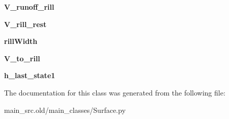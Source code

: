 \begin{DoxyCompactItemize}
\item 
\hypertarget{classmain__src_8old_1_1main__classes_1_1Surface_1_1SurArrs_ae21037f3984f4a9212bca50c4696e6f0}{{\bfseries V\-\_\-runoff\-\_\-rill}}\label{classmain__src_8old_1_1main__classes_1_1Surface_1_1SurArrs_ae21037f3984f4a9212bca50c4696e6f0}

\item 
\hypertarget{classmain__src_8old_1_1main__classes_1_1Surface_1_1SurArrs_aafcdb30381b35c91e4a321c55cbc0bb6}{{\bfseries V\-\_\-rill\-\_\-rest}}\label{classmain__src_8old_1_1main__classes_1_1Surface_1_1SurArrs_aafcdb30381b35c91e4a321c55cbc0bb6}

\item 
\hypertarget{classmain__src_8old_1_1main__classes_1_1Surface_1_1SurArrs_ad09ed2ed28e86901211f6c59d784e276}{{\bfseries rill\-Width}}\label{classmain__src_8old_1_1main__classes_1_1Surface_1_1SurArrs_ad09ed2ed28e86901211f6c59d784e276}

\item 
\hypertarget{classmain__src_8old_1_1main__classes_1_1Surface_1_1SurArrs_a339ba9f718a00efcb6e6bc539123c892}{{\bfseries V\-\_\-to\-\_\-rill}}\label{classmain__src_8old_1_1main__classes_1_1Surface_1_1SurArrs_a339ba9f718a00efcb6e6bc539123c892}

\item 
\hypertarget{classmain__src_8old_1_1main__classes_1_1Surface_1_1SurArrs_af00d52cdc3149f0e0e99f3905089a108}{{\bfseries h\-\_\-last\-\_\-state1}}\label{classmain__src_8old_1_1main__classes_1_1Surface_1_1SurArrs_af00d52cdc3149f0e0e99f3905089a108}

\end{DoxyCompactItemize}


The documentation for this class was generated from the following file\-:\begin{DoxyCompactItemize}
\item 
main\-\_\-src.\-old/main\-\_\-classes/Surface.\-py\end{DoxyCompactItemize}
